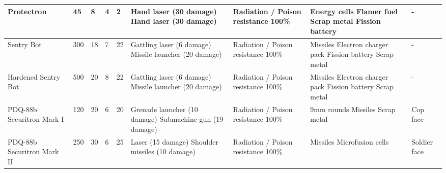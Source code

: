 \begin{longtable}{|p{2.3cm}|p{1cm}|p{1cm}|p{1cm}|p{1cm}|p{2.6cm}|p{2.6cm}|p{2.6cm}|p{2.6cm}|}
\hline
Protectron & 45 & 8 & 4 & 2 & Hand laser (30 damage) Hand laser (30 damage) & Radiation / Poison resistance 100\% & Energy cells Flamer fuel Scrap metal Fission battery & - \\
\hline
Sentry Bot & 300 & 18 & 7 & 22 & Gattling laser (6 damage) Missile launcher (20 damage) & Radiation / Poison resistance 100\% & Missiles Electron charger pack Fission battery Scrap metal & - \\
\hline
Hardened Sentry Bot & 500 & 20 & 8 & 22 & Gattling laser (6 damage) Missile launcher (20 damage) & Radiation / Poison resistance 100\% & Missiles Electron charger pack Fission battery Scrap metal & - \\
\hline
PDQ-88b Securitron Mark I & 120 & 20 & 6 & 20 & Grenade launcher (10 damage) Submachine gun (19 damage) & Radiation / Poison resistance 100\% & 9mm rounds Missiles Scrap metal & Cop face \\
\hline
PDQ-88b Securitron Mark II & 250 & 30 & 6 & 25 & Laser (15 damage) Shoulder missiles (10 damage) & Radiation / Poison resistance 100\% & Missiles Microfusion cells & Soldier face \\
\hline
\end{longtable}
